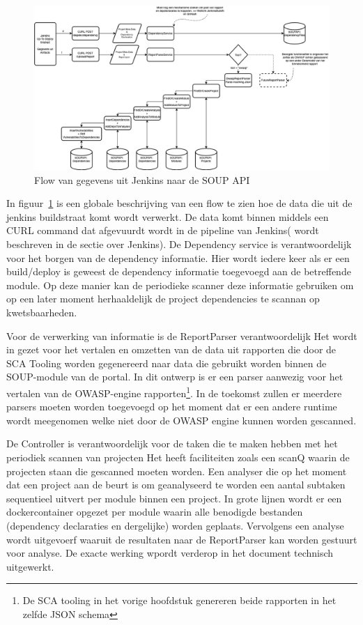 \begin{figure}[bth]
  \myfloatalign
  \includegraphics[width=15cm]{gfx/SOUPAPI-ReportParseFlow}
  \caption{Flow van gegevens uit Jenkins naar de SOUP API}
  \label{fig:SOUP-ReportPArseFlow}
\end{figure}

In figuur~\ref{fig:SOUP-ReportPArseFlow} is een globale beschrijving van een flow te zien hoe de data die uit de jenkins buildstraat komt wordt verwerkt. De data komt binnen middels een CURL command dat afgevuurdt wordt in de pipeline van Jenkins( wordt beschreven in de sectie over Jenkins).
De Dependency service is verantwoordelijk voor het borgen van de dependency informatie. Hier wordt iedere keer als er een build/deploy is geweest de dependency informatie toegevoegd aan de betreffende module. Op deze manier kan de periodieke scanner deze informatie gebruiken om op een later moment herhaaldelijk de project dependencies te scannan op kwetsbaarheden.




Voor de verwerking van informatie is de ReportParser verantwoordelijk  Het wordt in gezet voor het vertalen en omzetten van de data uit rapporten die door de SCA Tooling worden gegenereerd naar data die gebruikt worden binnen de SOUP-module van de portal. In dit ontwerp is er een parser aanwezig voor het vertalen van de OWASP-engine rapporten\footnote{De SCA tooling in het vorige hoofdstuk genereren beide rapporten in het zelfde JSON schema}. In de toekomst zullen er meerdere parsers moeten worden toegevoegd op het moment dat er een andere runtime wordt meegenomen welke niet door de OWASP engine kunnen worden gescanned.

De Controller is verantwoordelijk voor de taken die te maken hebben met het periodiek scannen van projecten Het heeft faciliteiten zoals een scanQ waarin de projecten staan die gescanned moeten worden. Een analyser die op het moment dat een project aan de beurt is om geanalyseerd te worden een aantal subtaken sequentieel uitvert per module binnen een project.
In grote lijnen wordt er een dockercontainer opgezet per module waarin alle benodigde bestanden (dependency declaraties en dergelijke) worden geplaats. Vervolgens een analyse wordt uitgevoerf waaruit de resultaten naar de ReportParser kan worden gestuurt voor analyse. De exacte werking wpordt verderop in het document technisch uitgewerkt.

